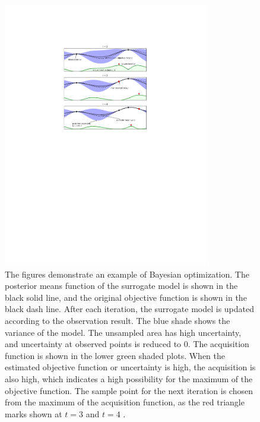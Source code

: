 \begin{figure}[htbp!]
\centering
\includegraphics[width=0.8\textwidth]{figures/bay opt.pdf}
\caption{The figures demonstrate an example of Bayesian optimization. The posterior means function of the surrogate model is shown in the black solid line, and the original objective function is shown in the black dash line. After each iteration, the surrogate model is updated according to the observation result. The blue shade shows the variance of the model. The unsampled area has high uncertainty, and uncertainty at observed points is reduced to 0. The acquisition function is shown in the lower green shaded plots. When the estimated objective function or uncertainty is high, the acquisition is also high, which indicates a high possibility for the maximum of the objective function. The sample point for the next iteration is chosen from the maximum of the acquisition function, as the red triangle marks shown at $t=3$ and $t=4$ \cite{brochu2010tutorial}.}
\label{bayesian optimization}
\end{figure}


